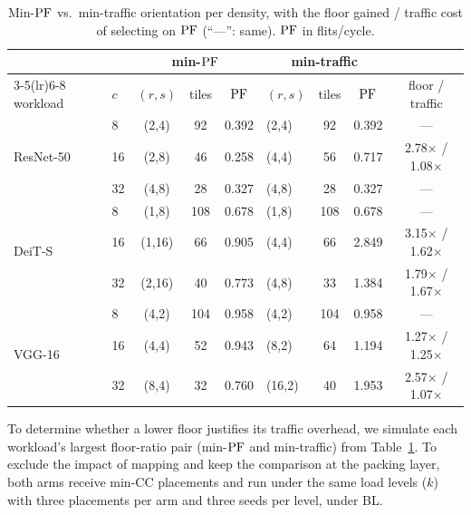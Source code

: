 \begin{table}[b]
  \caption{Min-$\mathrm{PF}$ vs.\ min-traffic orientation per density, with the floor
  gained / traffic cost of selecting on $\mathrm{PF}$ (``---'': same). $\mathrm{PF}$ in flits/cycle.}
  \label{tab:packing}
  \centering
  \footnotesize
  \setlength{\tabcolsep}{3pt}
  \begin{tabular}{@{}llccclccc@{}}
    \toprule
    & & \multicolumn{3}{c}{min-$\mathrm{PF}$} & \multicolumn{3}{c}{min-traffic} & \\
    \cmidrule(lr){3-5}\cmidrule(lr){6-8}
    workload & $c$ & $(r,s)$ & tiles & $\mathrm{PF}$ & $(r,s)$ & tiles & $\mathrm{PF}$ & floor / traffic \\
    \midrule
    \multirow{3}{*}{ResNet-50} &  8 & (2,4)  &  92 & 0.392 & (2,4)  &  92 & 0.392 & --- \\
                               & 16 & (2,8)  &  46 & 0.258 & (4,4)  &  56 & 0.717 & 2.78$\times$ / 1.08$\times$ \\
                               & 32 & (4,8)  &  28 & 0.327 & (4,8)  &  28 & 0.327 & --- \\
    \midrule
    \multirow{3}{*}{DeiT-S}    &  8 & (1,8)  & 108 & 0.678 & (1,8)  & 108 & 0.678 & --- \\
                               & 16 & (1,16) &  66 & 0.905 & (4,4)  &  66 & 2.849 & 3.15$\times$ / 1.62$\times$ \\
                               & 32 & (2,16) &  40 & 0.773 & (4,8)  &  33 & 1.384 & 1.79$\times$ / 1.67$\times$ \\
    \midrule
    \multirow{3}{*}{VGG-16}    &  8 & (4,2)  & 104 & 0.958 & (4,2)  & 104 & 0.958 & --- \\
                               & 16 & (4,4)  &  52 & 0.943 & (8,2)  &  64 & 1.194 & 1.27$\times$ / 1.25$\times$ \\
                               & 32 & (8,4)  &  32 & 0.760 & (16,2) &  40 & 1.953 & 2.57$\times$ / 1.07$\times$ \\
    \bottomrule
  \end{tabular}
\end{table}

To determine whether a lower floor justifies its traffic overhead, we simulate each workload's largest floor-ratio pair (min-$\mathrm{PF}$ and min-traffic) from
Table~\ref{tab:packing}. To exclude the impact of mapping and keep the
comparison at the packing layer, both arms receive
min-$\mathrm{CC}$ placements and run under the same load
levels ($k$) with three placements per arm and three
seeds per level, under BL.


